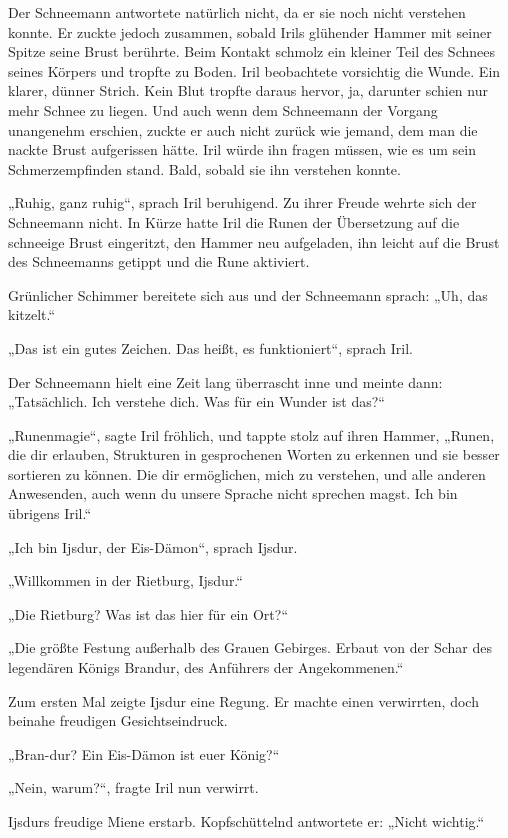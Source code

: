 Der Schneemann antwortete natürlich nicht, da er sie noch nicht verstehen konnte. Er zuckte jedoch zusammen, sobald Irils glühender Hammer mit seiner Spitze seine Brust berührte. Beim Kontakt schmolz ein kleiner Teil des Schnees seines Körpers und tropfte zu Boden. Iril beobachtete vorsichtig die Wunde. Ein klarer, dünner Strich. Kein Blut tropfte daraus hervor, ja, darunter schien nur mehr Schnee zu liegen. Und auch wenn dem Schneemann der Vorgang unangenehm erschien, zuckte er auch nicht zurück wie jemand, dem man die nackte Brust aufgerissen hätte. Iril würde ihn fragen müssen, wie es um sein Schmerzempfinden stand. Bald, sobald sie ihn verstehen konnte.

„Ruhig, ganz ruhig“, sprach Iril beruhigend. Zu ihrer Freude wehrte sich der Schneemann nicht. In Kürze hatte Iril die Runen der Übersetzung auf die schneeige Brust eingeritzt, den Hammer neu aufgeladen, ihn leicht auf die Brust des Schneemanns getippt und die Rune aktiviert.

Grünlicher Schimmer bereitete sich aus und der Schneemann sprach: „Uh, das kitzelt.“

„Das ist ein gutes Zeichen. Das heißt, es funktioniert“, sprach Iril.

Der Schneemann hielt eine Zeit lang überrascht inne und meinte dann: „Tatsächlich. Ich verstehe dich. Was für ein Wunder ist das?“

„Runenmagie“, sagte Iril fröhlich, und tappte stolz auf ihren Hammer, „Runen, die dir erlauben, Strukturen in gesprochenen Worten zu erkennen und sie besser sortieren zu können. Die dir ermöglichen, mich zu verstehen, und alle anderen Anwesenden, auch wenn du unsere Sprache nicht sprechen magst. Ich bin übrigens Iril.“

„Ich bin Ijsdur, der Eis-Dämon“, sprach Ijsdur.

„Willkommen in der Rietburg, Ijsdur.“

„Die Rietburg? Was ist das hier für ein Ort?“

„Die größte Festung außerhalb des Grauen Gebirges. Erbaut von der Schar des legendären Königs Brandur, des Anführers der Angekommenen.“

Zum ersten Mal zeigte Ijsdur eine Regung. Er machte einen verwirrten, doch beinahe freudigen Gesichtseindruck.

„Bran-dur? Ein Eis-Dämon ist euer König?“

„Nein, warum?“, fragte Iril nun verwirrt.

Ijsdurs freudige Miene erstarb. Kopfschüttelnd antwortete er: „Nicht wichtig.“

